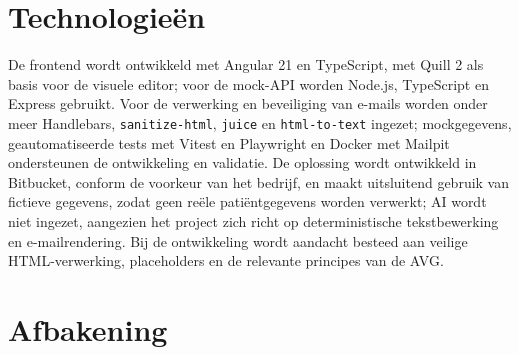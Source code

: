 
\section{Technologieën}%
\label{vst:technologieen}

%
%

De frontend wordt ontwikkeld met Angular 21 en TypeScript, met Quill 2 als
basis voor de visuele editor; voor de mock-API worden Node.js, TypeScript en
Express gebruikt. Voor de verwerking en beveiliging van e-mails worden onder
meer Handlebars, \texttt{sanitize-html}, \texttt{juice} en
\texttt{html-to-text} ingezet; mockgegevens, geautomatiseerde tests met Vitest
en Playwright en Docker met Mailpit ondersteunen de ontwikkeling en validatie.
De oplossing wordt ontwikkeld in Bitbucket, conform de voorkeur van het
bedrijf, en maakt uitsluitend gebruik van fictieve gegevens, zodat geen
reële patiëntgegevens worden verwerkt; AI wordt niet ingezet, aangezien het
project zich richt op deterministische tekstbewerking en e-mailrendering.
Bij de ontwikkeling wordt aandacht besteed aan veilige HTML-verwerking,
placeholders en de relevante principes van de AVG.


\section{Afbakening}%
\label{vst:afbakening}

%
%

